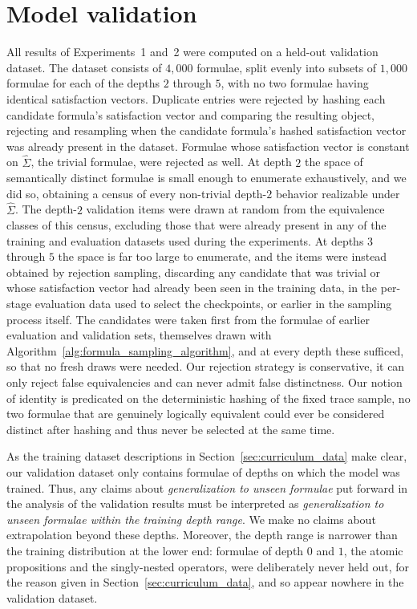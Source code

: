 \documentclass[titlepage,a4paper,11pt]{report}
\begin{document}
    \section{Model validation}\label{sec:model_validation}
    All results of Experiments~1 and~2 were computed on a held-out validation dataset. The dataset consists of $4{,}000$ formulae, split evenly into subsets of $1{,}000$ formulae for each of the depths $2$ through $5$, with no two formulae having identical satisfaction vectors. Duplicate entries were rejected by hashing each candidate formula's satisfaction vector and comparing the resulting object, rejecting and resampling when the candidate formula's hashed satisfaction vector was already present in the dataset. Formulae whose satisfaction vector is constant on $\widehat\Sigma$, the trivial formulae, were rejected as well. At depth $2$ the space of semantically distinct formulae is small enough to enumerate exhaustively, and we did so, obtaining a census of every non-trivial depth-$2$ behavior realizable under $\widehat \Sigma$. The depth-$2$ validation items were drawn at random from the equivalence classes of this census, excluding those that were already present in any of the training and evaluation datasets used during the experiments. At depths $3$ through $5$ the space is far too large to enumerate, and the items were instead obtained by rejection sampling, discarding any candidate that was trivial or whose satisfaction vector had already been seen in the training data, in the per-stage evaluation data used to select the checkpoints, or earlier in the sampling process itself. The candidates were taken first from the formulae of earlier evaluation and validation sets, themselves drawn with Algorithm~\ref{alg:formula_sampling_algorithm}, and at every depth these sufficed, so that no fresh draws were needed. Our rejection strategy is conservative, it can only reject false equivalencies and can never admit false distinctness. Our notion of identity is predicated on the deterministic hashing of the fixed trace sample, no two formulae that are genuinely logically equivalent could ever be considered distinct after hashing and thus never be selected at the same time. 
    
    As the training dataset descriptions in Section~\ref{sec:curriculum_data} make clear, our validation dataset only contains formulae of depths on which the model was trained. Thus, any claims about \emph{generalization to unseen formulae} put forward in the analysis of the validation results must be interpreted as \emph{generalization to unseen formulae within the training depth range}. We make no claims about extrapolation beyond these depths. Moreover, the depth range is narrower than the training distribution at the lower end: formulae of depth $0$ and $1$, the atomic propositions and the singly-nested operators, were deliberately never held out, for the reason given in Section~\ref{sec:curriculum_data}, and so appear nowhere in the validation dataset.
    
\end{document}
